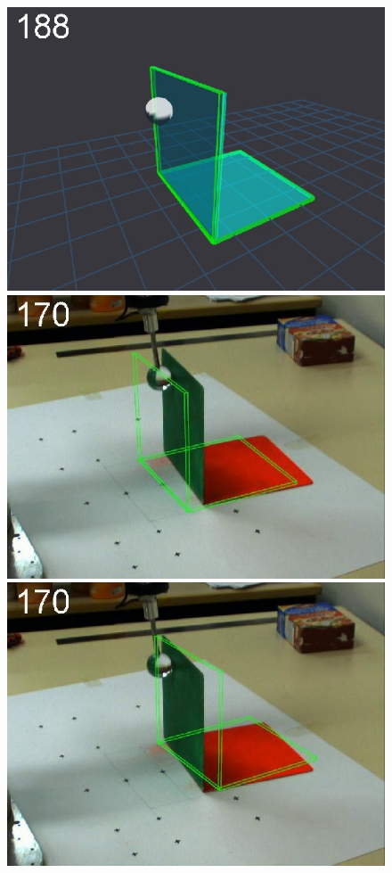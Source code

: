\begin{figure}[tb]
{\includegraphics[width=\imgBXwid]{./B1_3exp_20_2}
\includegraphics[width=\imgBXwid]{./B2_1exp_58_2}
\includegraphics[width=\imgBXwid]{./B2_2exp_58_2}
}
\end{figure}
